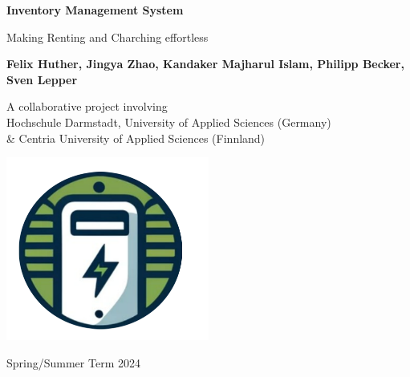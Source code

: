 \begin{titlepage}
    \begin{center}
            
        \Huge
        \textbf{Inventory Management System}
            
        \vspace{0.3cm}
        \Large
        Making Renting and Charching effortless
            
        \vspace{1.0cm}
            
        \textbf{
        Felix Huther,
        Jingya Zhao,
        Kandaker Majharul Islam,
        Philipp Becker,
        Sven Lepper }
          
        \vfill            
        A collaborative project involving\\
        Hochschule Darmstadt, University of Applied Sciences (Germany) \\\&
        Centria University of Applied Sciences (Finnland)

        \vspace{0.5cm}
            
        \includegraphics[width=0.5\textwidth]{images/logo.png}

            
        \Large
      
        Spring/Summer Term 2024
            
    \end{center}
\end{titlepage}

